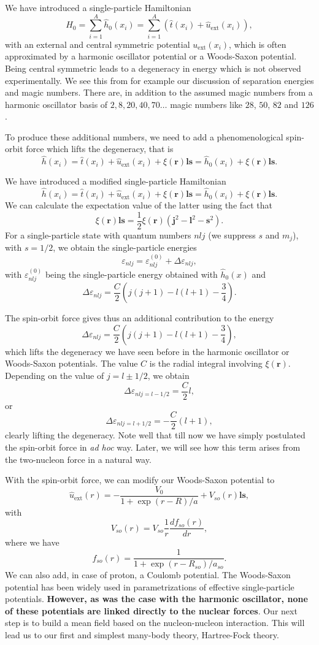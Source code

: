 \documentclass[%
twoside,                 %
final,                   %
10pt]{article}
\begin{document}
\noindent
We have introduced a single-particle Hamiltonian
\[
  H_0=\sum_{i=1}^A \hat{h}_0(x_i) =  \sum_{i=1}^A\left(\hat{t}(x_i) + \hat{u}_{\mathrm{ext}}(x_i)\right),
\]
with an external and central symmetric potential $u_{\mathrm{ext}}(x_i)$, which is often 
approximated by a harmonic oscillator potential or a Woods-Saxon potential. Being central symmetric leads to a degeneracy 
in energy which is not observed experimentally. We see this from for example our discussion of separation energies and magic numbers. There are, in addition to the assumed magic numbers from a harmonic oscillator basis of $2,8,20,40,70\dots$ magic numbers like $28$, $50$, $82$ and $126$. 

To produce these additional numbers, we need to add a phenomenological spin-orbit force which lifts the degeneracy, that is
\[
\hat{h}(x_i) =  \hat{t}(x_i) + \hat{u}_{\mathrm{ext}}(x_i) +\xi(\bm{r})\bm{ls}=\hat{h}_0(x_i)+\xi(\bm{r})\bm{ls}. 
\]

We have introduced a modified single-particle Hamiltonian
\[
\hat{h}(x_i) =  \hat{t}(x_i) + \hat{u}_{\mathrm{ext}}(x_i) +\xi(\bm{r})\bm{ls}=\hat{h}_0(x_i)+\xi(\bm{r})\bm{ls}. 
\]
We can calculate the expectation value of the latter using the fact that
\[
\xi(\bm{r})\bm{ls}=\frac{1}{2}\xi(\bm{r})\left(\bm{j}^2-\bm{l}^2-\bm{s}^2\right).
\]
For a single-particle state with quantum numbers $nlj$ (we suppress $s$ and $m_j$), with $s=1/2$, we obtain the single-particle energies
\[
\varepsilon_{nlj} = \varepsilon_{nlj}^{(0)}+\Delta\varepsilon_{nlj}, 
\]
with $\varepsilon_{nlj}^{(0)}$ being the single-particle energy obtained with $\hat{h}_0(x)$ and
\[
\Delta\varepsilon_{nlj}=\frac{C}{2}\left(j(j+1)-l(l+1)-\frac{3}{4}\right).
\]


The spin-orbit force gives thus an additional contribution to the energy
\[
\Delta\varepsilon_{nlj}=\frac{C}{2}\left(j(j+1)-l(l+1)-\frac{3}{4}\right),
\]
which lifts the degeneracy we have seen before in the harmonic oscillator or Woods-Saxon potentials. The value $C$ is the radial
integral involving $\xi(\bm{r})$. Depending on the value of $j=l\pm 1/2$, we obtain 
\[
\Delta\varepsilon_{nlj=l-1/2}=\frac{C}{2}l,
\]
or
\[
\Delta\varepsilon_{nlj=l+1/2}=-\frac{C}{2}(l+1),
\]
clearly lifting the degeneracy. Note well that till now we have simply postulated the spin-orbit force in \emph{ad hoc} way.
Later, we will see how this term arises from the two-nucleon force in a natural way. 


With the spin-orbit force, we can modify our Woods-Saxon potential to 
\[
\hat{u}_{\mathrm{ext}}(r)=-\frac{V_0}{1+\exp{(r-R)/a}}+V_{so}(r)\bm{ls},
\]
with
\[
V_{so}(r) = V_{so}\frac{1}{r}\frac{d f_{so}(r)}{dr},
\]
where we have 
\[
f_{so}(r) = \frac{1}{1+\exp{(r-R_{so})/a_{so}}}.
\]
We can also add, in case of proton, a Coulomb potential. The Woods-Saxon potential has been widely used in parametrizations of
effective single-particle potentials. \textbf{However, as was the case with the harmonic oscillator, none of these potentials are linked directly to the nuclear forces}. Our next step is to build a mean field based on the nucleon-nucleon interaction.
This will lead us to our first and simplest many-body theory, Hartree-Fock theory.  
\end{document}
